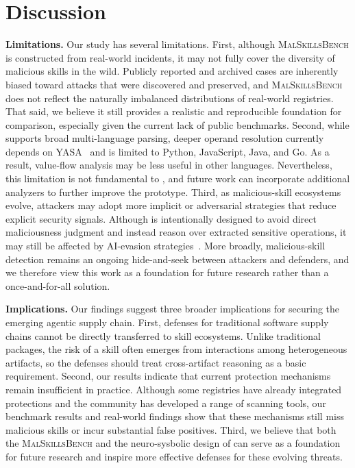 \section{Discussion}
\noindent \textbf{Limitations.}
Our study has several limitations. First, although \textsc{MalSkillsBench} is constructed from real-world incidents, it may not fully cover the diversity of malicious skills in the wild. Publicly reported and archived cases are inherently biased toward attacks that were discovered and preserved, and \textsc{MalSkillsBench} does not reflect the naturally imbalanced distributions of real-world registries. That said, we believe it still provides a realistic and reproducible foundation for comparison, especially given the current lack of public benchmarks.
Second, while \toolname supports broad multi-language parsing, deeper operand resolution currently depends on YASA~\cite{yasa-engine,wang2026yasa} and is limited to Python, JavaScript, Java, and Go. As a result, value-flow analysis may be less useful in other languages. Nevertheless, this limitation is not fundamental to \toolname, and future work can incorporate additional analyzers to further improve the prototype.
Third, as malicious-skill ecosystems evolve, attackers may adopt more implicit or adversarial strategies that reduce explicit security signals. Although \toolname is intentionally designed to avoid direct maliciousness judgment and instead reason over extracted sensitive operations, it may still be affected by AI-evasion strategies~\cite{checkpoint2025aievasion,melo2025aimalwarepromptinjection}. More broadly, malicious-skill detection remains an ongoing hide-and-seek between attackers and defenders, and we therefore view this work as a foundation for future research rather than a once-and-for-all solution.

\noindent \textbf{Implications.}
Our findings suggest three broader implications for securing the emerging agentic supply chain. First, defenses for traditional software supply chains cannot be directly transferred to skill ecosystems. Unlike traditional packages, the risk of a skill often emerges from interactions among heterogeneous artifacts, so the defenses should treat cross-artifact reasoning as a basic requirement.
Second, our results indicate that current protection mechanisms remain insufficient in practice. Although some registries have already integrated protections and the community has developed a range of scanning tools, our benchmark results and real-world findings show that these mechanisms still miss malicious skills or incur substantial false positives. 
Third, we believe that both the \textsc{MalSkillsBench} and the neuro-sysbolic design of \toolname can serve as a foundation for future research and inspire more effective defenses for these evolving threats.

